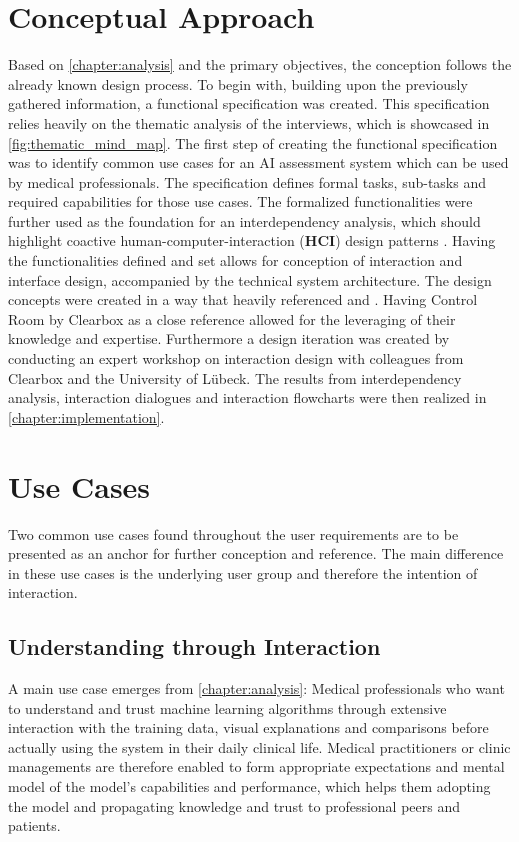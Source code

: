 \documentclass[11pt,a4paper,english]{scrreprt}
\begin{document}
\section{Conceptual Approach}\label{section:conceptual_approach}
Based on \autoref{chapter:analysis} and the primary objectives, the conception follows the already known design process. To begin with, building upon the previously gathered information, a functional specification was created. This specification relies heavily on the thematic analysis of the interviews, which is showcased in \autoref{fig:thematic_mind_map}. The first step of creating the functional specification was to identify common use cases for an AI assessment system which can be used by medical professionals. The specification defines formal tasks, sub-tasks and required capabilities for those use cases. The formalized functionalities were further used as the foundation for an interdependency analysis, which should highlight coactive human-computer-interaction (\textbf{HCI}) design patterns \parencite{johnson_coactive_2014}. Having the functionalities defined and set allows for conception of interaction and interface design, accompanied by the technical system architecture. The design concepts were created in a way that heavily referenced \textcite{people_ai_google_website} and \textcite{clearbox_website}. Having Control Room by Clearbox as a close reference allowed for the leveraging of their knowledge and expertise. Furthermore a design iteration was created by conducting an expert workshop on interaction design with colleagues from Clearbox and the University of Lübeck. The results from interdependency analysis, interaction dialogues and interaction flowcharts were then realized in \autoref{chapter:implementation}.

\section{Use Cases}\label{section:use_cases}
Two common use cases found throughout the user requirements are to be presented as an anchor for further conception and reference. The main difference in these use cases is the underlying user group and therefore the intention of interaction.

\subsection{Understanding through Interaction}
A main use case emerges from \autoref{chapter:analysis}: Medical professionals who want to understand and trust machine learning algorithms through extensive interaction with the training data, visual explanations and comparisons before actually using the system in their daily clinical life. Medical practitioners or clinic managements are therefore enabled to form appropriate expectations and mental model of the model's capabilities and performance, which helps them adopting the model and propagating knowledge and trust to professional peers and patients.
\end{document}
